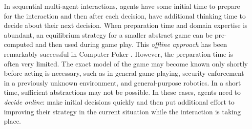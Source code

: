 \documentclass{aamas2015}
\newcommand{\eg}{{\it e.g.}~}
\begin{document}
In sequential multi-agent interactions, agents have some initial time to prepare for the interaction and then after each decision, have additional thinking time to decide about their next decision. When preparation time and domain expertise is abundant, an equilibrium strategy for a smaller abstract game can be pre-computed and then used during game play. This {\it offline approach} has been remarkably successful in 
Computer Poker \cite{Sandholm10The,Rubin11Poker,Gilpin09,Johanson07Msc,Johanson13Evaluating}.
However, the preparation time is often very limited. The exact model of the game may become known only shortly before acting is necessary, such as in general game-playing, security enforcement in a previously unknown environment, and general-purpose robotics. In a short time, sufficient abstractions may not be possible. In these cases, agents need to {\it decide online}: make initial decisions quickly and then put additional effort to improving their strategy in the current situation while the interaction is taking place.


\end{document}
